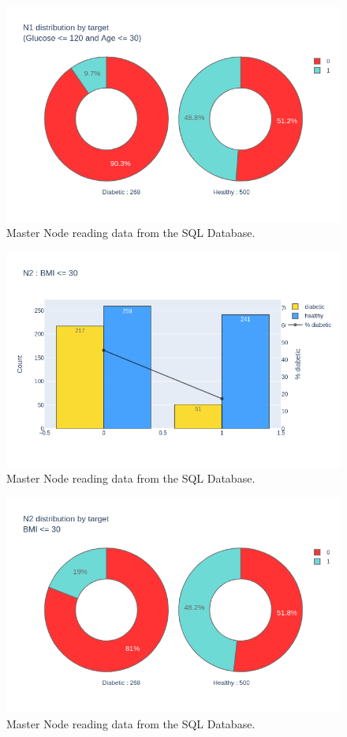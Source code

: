 \documentclass[12pt]{article}
\begin{document}
\begin{figure}[ht]
\centering
\includegraphics[width=1\textwidth]{newplot(14).png}
\caption{Master Node reading data from the SQL Database.}
\end{figure}

\begin{figure}[ht]
\centering
\includegraphics[width=1\textwidth]{newplot(15).png}
\caption{Master Node reading data from the SQL Database.}
\end{figure}

\begin{figure}[ht]
\centering
\includegraphics[width=1\textwidth]{newplot(16).png}
\caption{Master Node reading data from the SQL Database.}
\end{figure}
\end{document}
